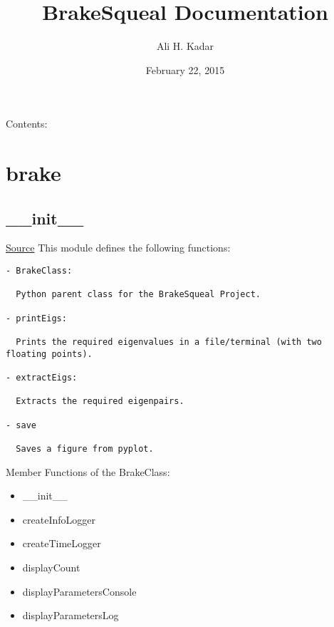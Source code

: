 \documentclass[letterpaper,10pt,english]{sphinxmanual}
\title{BrakeSqueal Documentation}
\date{February 22, 2015}
\author{Ali H. Kadar}
\begin{document}
\maketitle
\tableofcontents
{}\label{index::doc}


Contents:


\chapter{brake}
\label{index:brake}\label{index:welcome-to-brakesqueal-s-documentation}

\section{\_\_init\_\_}
\label{index:init}
\href{https://bitbucket.org/akadar/brakesqueal0.1/src/master/brake/\_\_init\_\_.py?at=master}{Source}
\label{index:module-brake.__init__}
This module defines the following functions:

\begin{Verbatim}[commandchars=\\\{\}]
- BrakeClass:

  Python parent class for the BrakeSqueal Project.
  
- printEigs:
  
  Prints the required eigenvalues in a file/terminal (with two floating points).
  
- extractEigs:
 
  Extracts the required eigenpairs.
  
- save
  
  Saves a figure from pyplot.
\end{Verbatim}

\begin{fulllineitems}
\label{index:brake.__init__.BrakeClass}
Member Functions of the BrakeClass:
\begin{itemize}
\item {} 
\_\_init\_\_

\item {} 
createInfoLogger

\item {} 
createTimeLogger

\item {} 
displayCount

\item {} 
displayParametersConsole

\item {} 
displayParametersLog

\end{itemize}

\end{fulllineitems}
\end{document}
